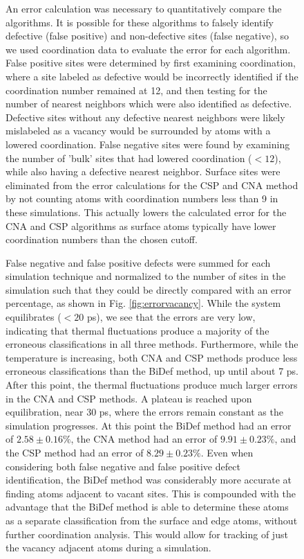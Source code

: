 \documentclass[12pt]{iopart}
\begin{document}
\begin{figure}[htbp]
An error calculation was necessary to quantitatively compare the algorithms. It is possible for these algorithms to falsely identify defective (false positive) and non-defective sites (false negative), so we used coordination data to evaluate the error for each algorithm. False positive sites were determined by first examining coordination, where a site labeled as defective would be incorrectly identified if the coordination number remained at 12, and then testing for the number of nearest neighbors which were also identified as defective. Defective sites without any defective nearest neighbors were likely mislabeled as a vacancy would be surrounded by atoms with a lowered coordination. False negative sites were found by examining the number of 'bulk' sites that had lowered coordination ($<12$), while also having a defective nearest neighbor. Surface sites were eliminated from the error calculations for the CSP and CNA method by not counting atoms with coordination numbers less than 9 in these simulations. This actually lowers the calculated error for the CNA and CSP algorithms as surface atoms typically have lower coordination numbers than the chosen cutoff. 

False negative and false positive defects were summed for each simulation technique and normalized to the number of sites in the simulation such that they could be directly compared with an error percentage, as shown in Fig. \ref{fig:errorvacancy}. While the system equilibrates ($<20$ ps), we see that the errors are very low, indicating that thermal fluctuations produce a majority of the erroneous classifications in all three methods. Furthermore, while the temperature is increasing, both CNA and CSP methods produce less erroneous classifications than the BiDef method, up until about 7 ps. After this point, the thermal fluctuations produce much larger errors in the CNA and CSP methods. A plateau is reached upon equilibration, near 30 ps, where the errors remain constant as the simulation progresses. At this point the BiDef method had an error of $2.58 \pm 0.16 \%$, the CNA method had an error of $9.91 \pm 0.23 \%$, and the CSP method had an error of $8.29 \pm 0.23 \%$. Even when considering both false negative and false positive defect identification, the BiDef method was considerably more accurate at finding atoms adjacent to vacant sites. This is compounded with the advantage that the BiDef method is able to determine these atoms as a separate classification from the surface and edge atoms, without further coordination analysis. This would allow for tracking of just the vacancy adjacent atoms during a simulation.


\end{figure}
\end{document}

